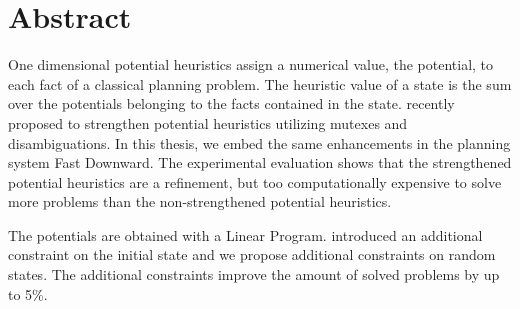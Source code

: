 \chapter{Abstract}\label{ch:abstract}

One dimensional potential heuristics assign a numerical value, the potential, to each fact of a classical planning problem.
The heuristic value of a state is the sum over the potentials belonging to the facts contained in the state.
\cite{fivser2020strengthening} recently proposed to strengthen potential heuristics utilizing mutexes and disambiguations.
In this thesis, we embed the same enhancements in the planning system Fast Downward.
The experimental evaluation shows that the strengthened potential heuristics are a refinement, but too computationally expensive to solve more problems than the non-strengthened potential heuristics.

The potentials are obtained with a Linear Program.
\cite{fivser2020strengthening} introduced an additional constraint on the initial state and we propose additional constraints on random states.
The additional constraints improve the amount of solved problems by up to 5\%.
